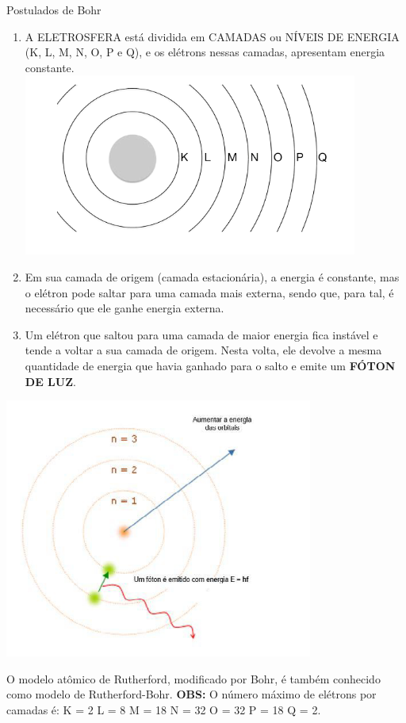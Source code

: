 \documentclass[10pt]{scrartcl}
\begin{document}
\begin{Box2}{Postulados de Bohr}
\begin{enumerate}
\item A  ELETROSFERA está dividida em CAMADAS ou NÍVEIS DE ENERGIA (K, L, M, N, O, P e Q), e os elétrons nessas camadas, apresentam energia constante.  \includegraphics[scale=.3]{./Quimica-Geral-Aula/camadas.png}
\item Em sua camada de origem (camada estacionária), a  energia  é  constante,  mas  o  elétron  pode  saltar  para  uma  camada  mais  externa,  sendo  que,  para  tal, é necessário que ele ganhe energia externa.
\item Um  elétron  que  saltou  para  uma  camada  de  maior energia fica instável e tende a voltar a sua camada de origem. Nesta volta, ele devolve a mesma quantidade de energia que havia ganhado para o salto e emite um \textbf{FÓTON DE LUZ}.
\end{enumerate}

\end{Box2}
 \includegraphics[scale=.5]{./Quimica-Geral-Aula/foton.png}  

O modelo atômico de Rutherford, modificado por Bohr, é também conhecido como modelo de Rutherford-Bohr.
\textbf{OBS:} O número máximo de elétrons por camadas é:  K = 2	L = 8	M = 18	N = 32	O = 32	P = 18	Q = 2.
\end{document}
